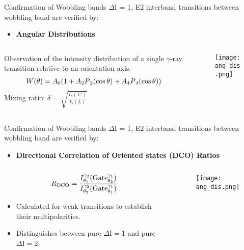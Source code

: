 \documentclass [11pt]{beamer}
\begin{document}
\begin{frame}{Confirmation of Wobbling bands}
$\Delta\mathrm{I}$ = 1, E2 interband transitions between wobbling band are verified by:
\begin{itemize}
\item {\textbf{Angular Distributions}}
\end{itemize}
\begin{columns}[c]
\begin{column}{0.6\textwidth}
Observation of the intensity distribution of a single $\gamma$-ray transition relative to an orientation axis.
\begin{align*}
W(\theta) = A\textsubscript{0}(1 + A\textsubscript{2}P\textsubscript{2}(\cos\theta) + A\textsubscript{4}P\textsubscript{4}(\cos\theta))
\end{align*}
Mixing ratio: $\delta$ = $\sqrt{\frac{I_{\gamma}(L')}{I_{\gamma}(L)}}$
\end{column}
\begin{column}{0.4\textwidth}
\begin{figure}
\texttt{[image: ang\_dis.png]}
\end{figure}
\end{column}
\end{columns}
\end{frame}


\begin{frame}{Confirmation of Wobbling bands}
$\Delta\mathrm{I}$ = 1, E2 interband transitions between wobbling band are verified by:
\begin{itemize}
\item {\textbf{Directional Correlation of Oriented states (DCO) Ratios }}
\end{itemize}
\begin{columns}[c]
\begin{column}{0.6\textwidth}
\begin{align*}
R\textsubscript{DCO} = \frac{I_{\theta_{1}}^{\gamma_{2}}(\text{Gate}_{\theta_{2}}^{\gamma_{1}})}{I_{\theta_{2}}^{\gamma_{2}}(\text{Gate}_{\theta_{1}}^{\gamma_{1}})}
\end{align*}
\begin{itemize}
\item {Calculated for weak transitions to establish their multipolarities.}
\item {Distinguishes between pure $\Delta\mathrm{I} = 1$ and pure $\Delta\mathrm{I} = 2$.}
\end{itemize}
\end{column}
\begin{column}{0.4\textwidth}
\begin{figure}
\texttt{[image: ang\_dis.png]}
\end{figure}
\end{column}
\end{columns}
\end{frame}
\end{document}
